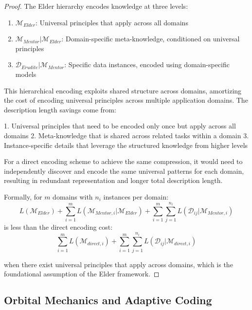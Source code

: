 \begin{proof}
The Elder hierarchy encodes knowledge at three levels:
\begin{enumerate}
    \item $\mathcal{M}_{Elder}$: Universal principles that apply across all domains
    \item $\mathcal{M}_{Mentor} | \mathcal{M}_{Elder}$: Domain-specific meta-knowledge, conditioned on universal principles
    \item $\mathcal{D}_{Erudite} | \mathcal{M}_{Mentor}$: Specific data instances, encoded using domain-specific models
\end{enumerate}

This hierarchical encoding exploits shared structure across domains, amortizing the cost of encoding universal principles across multiple application domains. The description length savings come from:

1. Universal principles that need to be encoded only once but apply across all domains
2. Meta-knowledge that is shared across related tasks within a domain
3. Instance-specific details that leverage the structured knowledge from higher levels

For a direct encoding scheme to achieve the same compression, it would need to independently discover and encode the same universal patterns for each domain, resulting in redundant representation and longer total description length.

Formally, for $m$ domains with $n_i$ instances per domain:
\begin{equation}
L(\mathcal{M}_{Elder}) + \sum_{i=1}^m L(\mathcal{M}_{Mentor,i} | \mathcal{M}_{Elder}) + \sum_{i=1}^m \sum_{j=1}^{n_i} L(\mathcal{D}_{ij} | \mathcal{M}_{Mentor,i})
\end{equation}
is less than the direct encoding cost:
\begin{equation}
\sum_{i=1}^m L(\mathcal{M}_{direct,i}) + \sum_{i=1}^m \sum_{j=1}^{n_i} L(\mathcal{D}_{ij} | \mathcal{M}_{direct,i})
\end{equation}

when there exist universal principles that apply across domains, which is the foundational assumption of the Elder framework.
\end{proof}

\subsection{Orbital Mechanics and Adaptive Coding}

